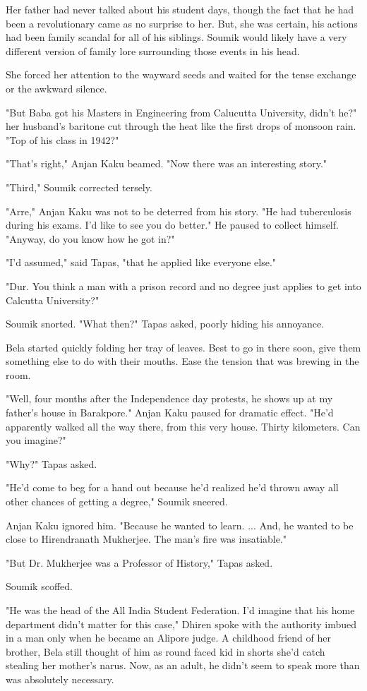 \documentclass{amsart}
\begin{document}
Her father had never talked about his student days, though the fact that he had been a revolutionary came as no surprise to her. But, she was certain, his actions had been family scandal for all of his siblings. Soumik would likely have a very different version of family lore surrounding those events in his head. 

She forced her attention to the wayward seeds and waited for the tense exchange or the awkward silence. 

"But Baba got his Masters in Engineering from Calucutta University, didn't he?" her husband's baritone cut through the heat like the first drops of monsoon rain. "Top of his class in 1942?"

"That's right," Anjan Kaku beamed. "Now there was an interesting story." 

"Third," Soumik corrected tersely.

"Arre," Anjan Kaku was not to be deterred from his story. "He had tuberculosis during his exams. I'd like to see you do better." He paused to collect himself. "Anyway, do you know how he got in?"

"I'd assumed," said Tapas, "that he applied like everyone else."

"Dur. You think a man with a prison record and no degree just applies to get into Calcutta University?"

Soumik snorted. "What then?" Tapas asked, poorly hiding his annoyance. 

Bela started quickly folding her tray of leaves. Best to go in there soon, give them something else to do with their mouths. Ease the tension that was brewing in the room.

"Well, four months after the Independence day protests, he shows up at my father's house in Barakpore." Anjan Kaku paused for dramatic effect. "He'd apparently walked all the way there, from this very house. Thirty kilometers. Can you imagine?"

"Why?" Tapas asked.

"He'd come to beg for a hand out because he'd realized he'd thrown away all other chances of getting a degree," Soumik sneered.

Anjan Kaku ignored him. "Because he wanted to learn. ... And, he wanted to be close to Hirendranath Mukherjee. The man's fire was insatiable."

"But Dr. Mukherjee was a Professor of History," Tapas asked. 

Soumik scoffed.

"He was the head of the All India Student Federation. I'd imagine that his home department didn't matter for this case," Dhiren spoke with the authority imbued in a man only when he became an Alipore judge. A childhood friend of her brother, Bela still thought of him as round faced kid in shorts she'd catch stealing her mother's narus. Now, as an adult, he didn't seem to speak more than was absolutely necessary.
\end{document}
